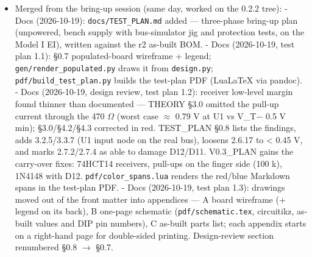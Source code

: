 \documentclass[11pt,a4paper]{article}
\begin{document}
\begin{itemize}[leftmargin=8mm]
\item Merged from the bring-up session (same day, worked on the 0.2.2 tree): - Docs (2026-10-19): \texttt{docs/TEST\_PLAN.md} added — three-phase bring-up plan (unpowered, bench supply with bus-simulator jig and protection tests, on the Model I EI), written against the r2 as-built BOM. - Docs (2026-10-19, test plan 1.1): §0.7 populated-board wireframe + legend; \texttt{gen/render\_populated.py} draws it from \texttt{design.py}; \texttt{pdf/build\_test\_plan.py} builds the test-plan PDF (LuaLaTeX via pandoc). - Docs (2026-10-19, design review, test plan 1.2): receiver low-level margin found thinner than documented — THEORY §3.0 omitted the pull-up current through the 470 $\Omega$ (worst case $\approx$ 0.79 V at U1 vs V\_T− 0.5 V min); §3.0/§4.2/§4.3 corrected in red. TEST\_PLAN §0.8 lists the findings, adds 3.2.5/3.3.7 (U1 input node on the real bus), loosens 2.6.17 to < 0.45 V, and marks 2.7.2/2.7.4 as able to damage D12/D11. V0.3\_PLAN gains the carry-over fixes: 74HCT14 receivers, pull-ups on the finger side (100 k), 1N4148 with D12. \texttt{pdf/color\_spans.lua} renders the red/blue Markdown spans in the test-plan PDF. - Docs (2026-10-19, test plan 1.3): drawings moved out of the front matter into appendices — A board wireframe (+ legend on its back), B one-page schematic (\texttt{pdf/schematic.tex}, circuitikz, as-built values and DIP pin numbers), C as-built parts list; each appendix starts on a right-hand page for double-sided printing. Design-review section renumbered §0.8 $\to$ §0.7.
\end{itemize}
\end{document}
